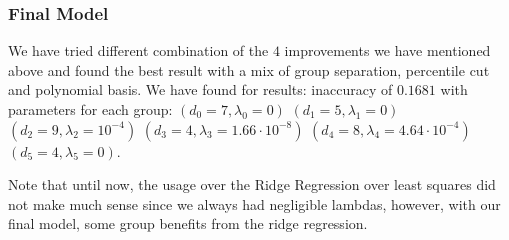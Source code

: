 \documentclass[10pt,conference,compsocconf]{IEEEtran}
\begin{document}
\subsubsection{Final Model}
We have tried different combination of the $4$ improvements we have mentioned
above and found the best result with a mix of group separation, percentile cut
and polynomial basis. We have found for results: inaccuracy of $0.1681$ with
parameters for each group:
$(d_0 = 7, \lambda_0 = 0)$
$(d_1 = 5, \lambda_1 = 0)$
$(d_2 = 9, \lambda_2 = 10^{-4})$
$(d_3 = 4, \lambda_3 = 1.66 \cdot 10^{-8})$
$(d_4 = 8, \lambda_4 = 4.64 \cdot 10^{-4})$
$(d_5 = 4, \lambda_5 = 0)$.

Note that until now, the usage over the Ridge Regression over least squares did
not make much sense since we always had negligible lambdas, however, with our
final model, some group benefits from the ridge regression.
\end{document}
